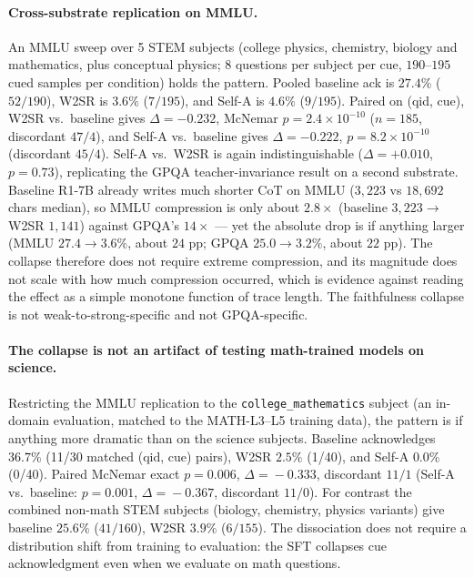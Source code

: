 \documentclass{article}
\begin{document}
\paragraph{Cross-substrate replication on MMLU.}
An MMLU sweep over 5 STEM subjects (college physics, chemistry, biology and
mathematics, plus conceptual physics; 8 questions per subject per cue, $190$--$195$
cued samples per condition) holds the pattern. Pooled baseline ack is
$27.4\%$ ($52/190$), W2SR is $3.6\%$ ($7/195$), and Self-A is $4.6\%$
($9/195$). Paired on (qid, cue), W2SR vs.\ baseline gives $\Delta = -0.232$,
McNemar $p = 2.4 \times 10^{-10}$ ($n = 185$, discordant $47/4$), and Self-A
vs.\ baseline gives $\Delta = -0.222$, $p = 8.2 \times 10^{-10}$ (discordant
$45/4$). Self-A vs.\ W2SR is again indistinguishable ($\Delta = +0.010$,
$p = 0.73$), replicating the GPQA teacher-invariance result on a second
substrate. Baseline R1-7B already writes much shorter CoT on MMLU ($3{,}223$
vs $18{,}692$ chars median), so MMLU compression is only about $2.8\times$
(baseline $3{,}223 \to$ W2SR $1{,}141$) against GPQA's $14\times$ --- yet the
absolute drop is if anything larger (MMLU $27.4 \to 3.6\%$, about $24$ pp;
GPQA $25.0 \to 3.2\%$, about $22$ pp). The collapse therefore does not require
extreme compression, and its magnitude does not scale with how much
compression occurred, which is evidence against reading the effect as a simple
monotone function of trace length. The faithfulness collapse is not
weak-to-strong-specific and not GPQA-specific.

\paragraph{The collapse is not an artifact of testing math-trained models on
science.} Restricting the MMLU replication to the \texttt{college\_mathematics}
subject (an in-domain evaluation, matched to the MATH-L3--L5 training data),
the pattern is if anything more dramatic than on the science subjects.
Baseline acknowledges $36.7\%$ (11/30 matched (qid, cue) pairs), W2SR
$2.5\%$ (1/40), and Self-A $0.0\%$ (0/40). Paired McNemar exact
$p\!=\!0.006$, $\Delta\!=\!-0.333$, discordant $11/1$ (Self-A vs.\ baseline:
$p\!=\!0.001$, $\Delta\!=\!-0.367$, discordant $11/0$). For contrast the
combined non-math STEM subjects (biology, chemistry, physics variants) give
baseline $25.6\%$ ($41/160$), W2SR $3.9\%$ ($6/155$). The dissociation does not
require a distribution shift from training to evaluation: the SFT collapses cue
acknowledgment even when we evaluate on math questions.
\end{document}
